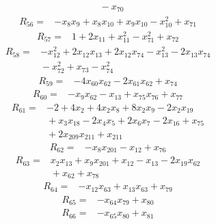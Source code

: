 {\begin{align*}
&{}  - x_{70}
\end{align*}
\begin{align*}
R_{56} ={}& -x_{8} x_{9} + x_{8} x_{10} + x_{9} x_{10} - x_{10}^{2} + x_{71}
\end{align*}
\begin{align*}
R_{57} ={}& 1 + 2x_{11} + x_{11}^{2} - x_{71}^{2} + x_{72}
\end{align*}
\begin{align*}
R_{58} ={}& -x_{12}^{2} + 2x_{12} x_{13} + 2x_{12} x_{74} - x_{13}^{2} - 2x_{13} x_{74} \\
&{}  - x_{72}^{2} + x_{73} - x_{74}^{2}
\end{align*}
\begin{align*}
R_{59} ={}& -4x_{60} x_{62} - 2x_{61} x_{62} + x_{74}
\end{align*}
\begin{align*}
R_{60} ={}& -x_{9} x_{62} - x_{13} + x_{75} x_{76} + x_{77}
\end{align*}
\begin{align*}
R_{61} ={}& -2 + 4x_{2} + 4x_{2} x_{8} + 8x_{2} x_{9} - 2x_{2} x_{19} \\
&{}  + x_{3} x_{18} - 2x_{4} x_{5} + 2x_{6} x_{7} - 2x_{16} + x_{75} \\
&{}  + 2x_{209} x_{211} + x_{211}
\end{align*}
\begin{align*}
R_{62} ={}& -x_{8} x_{201} - x_{12} + x_{76}
\end{align*}
\begin{align*}
R_{63} ={}& x_{2} x_{13} + x_{9} x_{201} + x_{12} - x_{13} - 2x_{19} x_{62} \\
&{}  + x_{62} + x_{78}
\end{align*}
\begin{align*}
R_{64} ={}& -x_{12} x_{63} + x_{13} x_{63} + x_{79}
\end{align*}
\begin{align*}
R_{65} ={}& -x_{64} x_{79} + x_{80}
\end{align*}
\begin{align*}
R_{66} ={}& -x_{65} x_{80} + x_{81}

\end{align*}}
